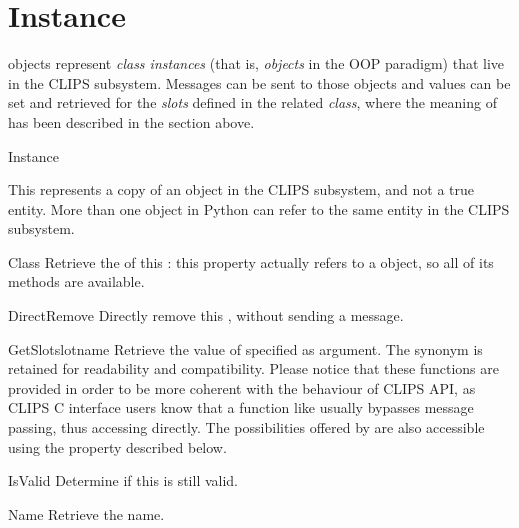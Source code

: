 \section{Instance\label{pyclips-cl-Instance}}

 objects represent \emph{class instances} (that is,
\emph{objects} in the OOP paradigm) that live in the CLIPS subsystem.
Messages can be sent to those objects and values can be set and retrieved
for the \emph{slots} defined in the related \emph{class}, where the
meaning of  has been described in the section above.

\begin{classdesc*}{Instance}

This represents a copy of an  object in the CLIPS
subsystem, and not a true  entity. More than one
 object in Python can refer to the same 
entity in the CLIPS subsystem.

\begin{memberdesc}[property]{Class}
Retrieve the  of this : this property
actually refers to a  object, so all of its methods are
available.
\end{memberdesc}

\begin{methoddesc}{DirectRemove}{}
Directly remove this , without sending a message.
\end{methoddesc}

\begin{methoddesc}{GetSlot}{slotname}
Retrieve the value of  specified as argument. The synonym
 is retained for readability and compatibility.
Please notice that these functions are provided in order to be more
coherent with the behaviour of CLIPS API, as CLIPS C interface users
know that a function like  usually bypasses message
passing, thus accessing  directly. The possibilities
offered by  are also accessible using the 
property described below.
\end{methoddesc}

\begin{methoddesc}{IsValid}{}
Determine if this  is still valid.
\end{methoddesc}

\begin{memberdesc}[property]{Name}
Retrieve the  name.
\end{memberdesc}


\end{classdesc*}
